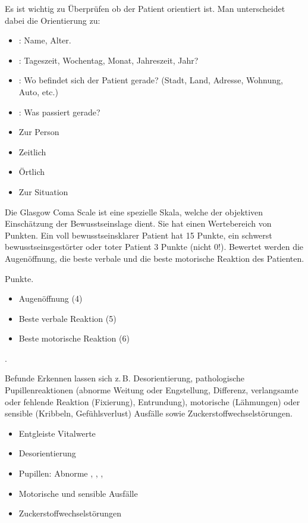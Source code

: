 {%
\label{topic:orientierung-apam}
%
Es ist wichtig zu Überprüfen ob der Patient orientiert ist.
Man unterscheidet dabei die Orientierung zu:  
\begin{itemize}
  \item {}: Name, Alter.
  \item {}: Tageszeit,
  Wochentag, Monat, Jahreszeit, Jahr?
  \item {}: Wo befindet sich der Patient gerade?
  \newline
  (Stadt, Land, Adresse, Wohnung, Auto, etc.)
  \item {}: Was passiert gerade?
\end{itemize}

}{
\begin{itemize}
    \item Zur Person
    \item Zeitlich
    \item Örtlich
    \item Zur Situation
\end{itemize}
}{}{}{}



{%
\label{topic:gcs-apam}
%
Die Glasgow Coma Scale ist eine spezielle Skala, welche der
objektiven Einschätzung der Bewusstseinslage  dient. Sie
hat einen Wertebereich von  Punkten. Ein voll
bewusstseinsklarer Patient hat 15 Punkte, ein schwerst
bewusstseinsgestörter oder toter Patient 3 Punkte (nicht
0!). Bewertet werden die Augenöffnung, die beste verbale und
die beste motorische Reaktion des
Patienten.
}{
 Punkte.
\begin{itemize}
    \item Augenöffnung (4)
    \item Beste verbale Reaktion (5)
    \item Beste motorische Reaktion (6)
\end{itemize}
.
}{}{}{}

\TextSlide
{{\eye} Befunde}
{Erkennen lassen sich z.\,B.  Desorientierung, pathologische
Pupillenreaktionen (abnorme Weitung oder Engstellung,
Differenz, verlangsamte oder fehlende Reaktion (Fixierung),
Entrundung), motorische (Lähmungen) oder sensible (Kribbeln,
Gefühlsverlust) Ausfälle sowie Zuckerstoffwechselstörungen.
}
{
\begin{itemize}
  \item Entgleiste Vitalwerte
  \item Desorientierung
  \item Pupillen: Abnorme , ,
  , 
  \item Motorische und sensible Ausfälle
  \item Zuckerstoffwechselstörungen
\end{itemize}
}
{}
{}
{}

